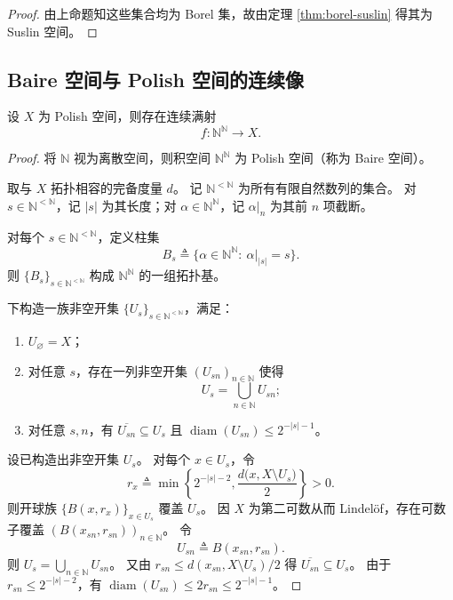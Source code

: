 \documentclass[lang=cn,a4paper,newtx,figureplace=section,tableplace=section]{elegantbook}
\begin{document}
\begin{proof}
  由上命题知这些集合均为 Borel 集，故由定理 \ref{thm:borel-suslin} 得其为 Suslin 空间。
\end{proof}

\subsection{Baire 空间与 Polish 空间的连续像}

\begin{lemma}\label{lem:polish-baire-surjection}
  设 $X$ 为 Polish 空间，则存在连续满射
  \[
    f:\mathbb{N}^{\mathbb{N}}\to X.
  \]
\end{lemma}

\begin{proof}
  将 $\mathbb{N}$ 视为离散空间，则积空间 $\mathbb{N}^{\mathbb{N}}$ 为 Polish 空间（称为 Baire 空间）。

  取与 $X$ 拓扑相容的完备度量 $d$。
  记 $\mathbb{N}^{<\mathbb{N}}$ 为所有有限自然数列的集合。
  对 $s\in\mathbb{N}^{<\mathbb{N}}$，记 $|s|$ 为其长度；对 $\alpha\in\mathbb{N}^{\mathbb{N}}$，记 $\alpha\vert_n$ 为其前 $n$ 项截断。

  对每个 $s\in\mathbb{N}^{<\mathbb{N}}$，定义柱集
  \[
    B_s\triangleq\{\alpha\in\mathbb{N}^{\mathbb{N}}:\ \alpha\vert_{|s|}=s\}.
  \]
  则 $\{B_s\}_{s\in\mathbb{N}^{<\mathbb{N}}}$ 构成 $\mathbb{N}^{\mathbb{N}}$ 的一组拓扑基。

  下构造一族非空开集 $\{U_s\}_{s\in\mathbb{N}^{<\mathbb{N}}}$，满足：
  \begin{enumerate}
    \item $U_\varnothing=X$；
    \item 对任意 $s$，存在一列非空开集 $(U_{sn})_{n\in\mathbb{N}}$ 使得
    \[
      U_s=\bigcup_{n\in\mathbb{N}}U_{sn};
    \]
    \item 对任意 $s,n$，有 $\overline{U_{sn}}\subseteq U_s$ 且 $\operatorname{diam}(U_{sn})\le 2^{-|s|-1}$。
  \end{enumerate}

  设已构造出非空开集 $U_s$。
  对每个 $x\in U_s$，令
  \[
    r_x\triangleq\min\left\{2^{-|s|-2},\frac{d\bigl(x,X\setminus U_s\bigr)}{2}\right\}>0.
  \]
  则开球族 $\{B(x,r_x)\}_{x\in U_s}$ 覆盖 $U_s$。
  因 $X$ 为第二可数从而 Lindel\"of，存在可数子覆盖 $(B(x_{sn},r_{sn}))_{n\in\mathbb{N}}$。
  令
  \[
    U_{sn}\triangleq B(x_{sn},r_{sn}).
  \]
  则 $U_s=\bigcup_{n\in\mathbb{N}}U_{sn}$。
  又由 $r_{sn}\le d(x_{sn},X\setminus U_s)/2$ 得 $\overline{U_{sn}}\subseteq U_s$。
  由于 $r_{sn}\le 2^{-|s|-2}$，有 $\operatorname{diam}(U_{sn})\le 2r_{sn}\le 2^{-|s|-1}$。


\end{proof}
\end{document}
